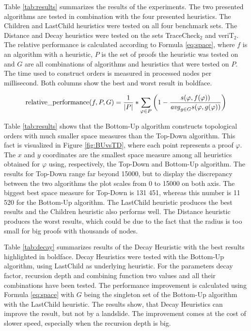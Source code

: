 Table \ref{tab:results} summarizes the results of the experiments.
The two presented algorithms are tested in combination with the four presented heuristics.
The Children and LastChild heuristics were tested on all four benchmark sets.
The Distance and Decay heuristics were tested on the sets TraceCheck$_2$ and veriT$_2$.
The relative performance is calculated according to Formula \ref{eq:space}, where $f$ is an algorithm with a heuristic, $P$ is the set of proofs the heuristic was tested on and $G$ are all combinations of algorithms and heuristics that were tested on $P$.
The time used to construct orders is measured in processed nodes per millisecond.
Both columns show the best and worst result in boldface.

\begin{align}
  \operatorname{relative\_performance}(f,P,G) = \frac{1}{|P|} * \sum_{\varphi \in P}{\left( 1 -
    \frac{
      s(\varphi,f(\varphi))
    }{
        \mathit{avg}_{g\in G}{s(\varphi,g(\varphi))}
    } \right)
  }
  \label{eq:space}
\end{align}

Table \ref{tab:results} shows that the Bottom-Up algorithm constructs topological orders with much smaller space measures than the Top-Down algorithm. 
This fact is visualized in Figure \ref{fig:BUvsTD}, where each point represents a proof $\varphi$.
The $x$ and $y$ coordinates are the smallest space measure among all heuristics obtained for $\varphi$ using, respectively, the Top-Down and Bottom-Up algorithm.
The results for Top-Down range far beyond 15000, but to display the discrepancy between the two algorithms the plot scales from 0 to 15000 on both axis.
The biggest best space measure for Top-Down is 131 451, whereas this number is 11 520 for the Bottom-Up algorithm.
The LastChild heuristic produces the best results and the Children heuristic also performs well.
The Distance heuristic produces the worst results, which could be due to the fact that the radius is too small for big proofs with thousands of  nodes.

Table \ref{tab:decay} summarizes results of the Decay Heuristic with the best results highlighted in boldface.
Decay Heuristics were tested with the Bottom-Up algorithm, using LastChild as underlying heuristic.
For the parameters decay factor, recursion depth and combining function two values and all their combinations have been tested.
The performance improvement is calculated using Formula \ref{eq:space} with $G$ being the singleton set of the Bottom-Up algorithm with the LastChild heuristic.
The results show, that Decay Heuristics can improve the result, but not by a landslide.
The improvement comes at the cost of slower speed, especially when the recursion depth is big.


